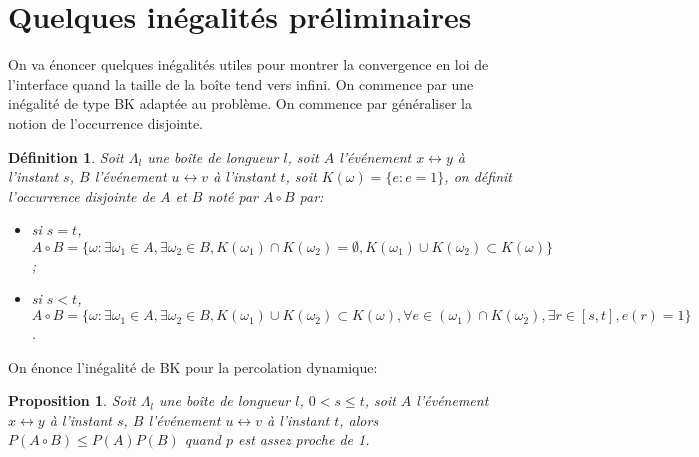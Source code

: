 \documentclass[titlepage,a4paper,11pt]{article}
\newcounter{def}
\newcounter{prop}
\newtheorem{occ}[def]{Définition}
\newtheorem{bk}[prop]{Proposition}
\newcommand{\connect}{\leftrightarrow}
\begin{document}
\section{Quelques inégalités préliminaires}
On va énoncer quelques inégalités utiles pour montrer la convergence en loi de l'interface quand la taille de la boîte tend vers infini. On commence par une inégalité de type BK adaptée au problème. On commence par généraliser la notion de l'occurrence disjointe.

\begin{occ}
Soit $\Lambda_l$ une boîte de longueur $l$, soit $A$ l'événement $x\connect y$ à l'instant $s$, $B$ l'événement $u\connect v$ à l'instant $t$, soit $K(\omega) = \{e: e=1\}$, on définit l'occurrence disjointe de $A$ et $B$ noté par $A\circ B$ par:
\begin{itemize}
\item si $s=t$, $A\circ B = \{\omega: \exists\omega_1\in A,\exists\omega_2\in B, K(\omega_1)\cap K(\omega_2) = \emptyset, K(\omega_1)\cup K(\omega_2)\subset K(\omega) \}$;
\item si $s<t$, $A\circ B = \{\omega: \exists\omega_1\in A,\exists\omega_2\in B, K(\omega_1)\cup K(\omega_2)\subset K(\omega), \forall e\in (\omega_1)\cap K(\omega_2), \exists r\in [s,t], e(r) = 1 \}$.
\end{itemize}
\end{occ}
On énonce l'inégalité de BK pour la percolation dynamique:

\begin{bk}
Soit $\Lambda_l$ une boîte de longueur $l$, $0<s\leqslant t$, soit $A$ l'événement $x\connect y$ à l'instant $s$, $B$ l'événement $u\connect v$ à l'instant $t$, alors $P(A\circ B) \leqslant P(A)P(B)$ quand $p$ est assez proche de 1.
\end{bk}
\end{document}
